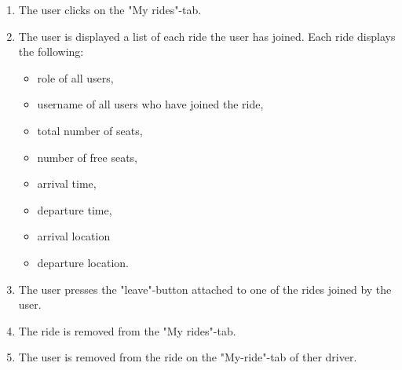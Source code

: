 \documentclass{article}
\begin{document}
\begin{enumerate}
    \item The user clicks on the "My rides"-tab.
    \item The user is displayed a list of each ride the user has joined. Each ride displays the following:
            \begin{itemize}
            \item role of all users,
            \item username of all users who have joined the ride,
            \item total number of seats,
            \item number of free seats,
            \item arrival time,
            \item departure time,
            \item arrival location
            \item departure location.
        \end{itemize} 
    \item The user presses the "leave"-button attached to one of the rides joined by the user.
    \item The ride is removed from the "My rides"-tab.
    \item The user is removed from the ride on the "My-ride"-tab of ther driver.
\end{enumerate} 
\mbox{}\\ \\
\end{document}
